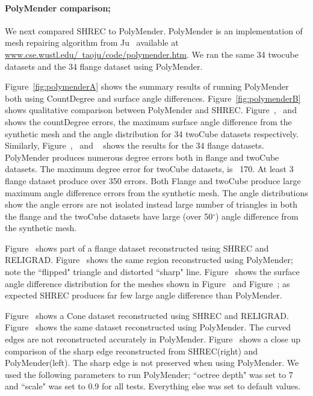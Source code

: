 \paragraph{PolyMender comparison;}
We next compared SHREC to PolyMender. PolyMender is an implementation of mesh repairing algorithm from Ju~\cite{j-rrpm-04} available at
\href{http://www.cse.wustl.edu/~taoju/code/polymender.htm}{www.cse.wustl.edu/~taoju/code/polymender.htm}.
We ran the same 34 twocube datasets and the 34 flange dataset using PolyMender. 

Figure~\ref{fig:polymenderA} shows the summary results of running PolyMender both using CountDegree and surface angle differences.
Figure~\ref{fig:polymenderB} shows qualitative comparison between PolyMender and SHREC. 
Figure~\protect{},~\protect{} and ~\protect{} shows the countDegree errors, the maximum surface angle difference from the synthetic mesh and the angle distribution for 34 twoCube datasets respectively. Similarly, 
Figure~\protect{},~\protect{} and ~\protect{} shows the results for the 34 flange datasets. PolyMender produces numerous degree errors both in flange and twoCube datasets. The maximum degree error for twoCube datasets, is ~170. At least 3 flange dataset produce over 350 errors. Both Flange and twoCube produce large maximum angle difference errors from the synthetic mesh. The angle distributions show the angle errors are not isolated instead large number of triangles in both the flange and the twoCube datasets have large (over 50$^\circ$) angle difference from the synthetic mesh.    

Figure~\protect{} shows part of a flange dataset reconstructed using SHREC and RELIGRAD. Figure~\protect{} shows the same region reconstructed using PolyMender; note the ``flipped" triangle and distorted ``sharp" line. Figure~\protect{} shows the surface angle  difference distribution for the meshes shown in Figure~\protect{} and Figure~\protect{}; as expected SHREC produces far few large angle difference than PolyMender.

Figure~\protect{} shows a Cone dataset reconstructed using SHREC and RELIGRAD. Figure~\protect{} shows the same dataset reconstructed using PolyMender. The curved edges are not reconstructed accurately in PolyMender. Figure~\protect{} shows a close up comparison of the sharp edge reconstructed from SHREC(right) and PolyMender(left). The sharp edge is not preserved when using PolyMender.  We used the following parameters to run PolyMender; ``octree depth" was set to 7 and ``scale" was set to 0.9 for all tests. Everything else was set to default values. 


